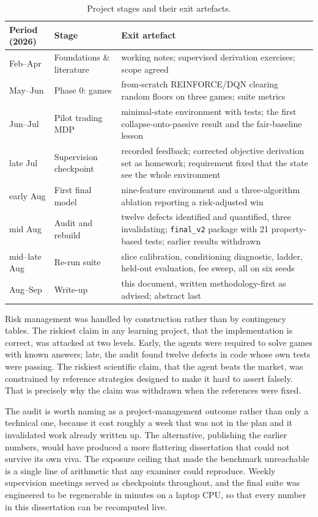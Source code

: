 \begin{table}[h]
\centering
\caption{Project stages and their exit artefacts.}
\label{tab:conc_plan}
\small
\begin{tabular}{llp{6.2cm}}
\toprule
\textbf{Period (2026)} & \textbf{Stage} & \textbf{Exit artefact} \\
\midrule
Feb--Apr & Foundations \& literature & working notes; supervised
derivation exercises; scope agreed \\
May--Jun & Phase 0: games & from-scratch REINFORCE/DQN clearing random
floors on three games; suite metrics \\
Jun--Jul & Pilot trading MDP & minimal-state environment with tests; the
first collapse-onto-passive result and the fair-baseline lesson \\
late Jul & Supervision checkpoint & recorded feedback; corrected objective
derivation set as homework; requirement fixed that the state see the whole
environment \\
early Aug & First final model & nine-feature environment and a
three-algorithm ablation reporting a risk-adjusted win \\
mid Aug & Audit and rebuild & twelve defects identified and quantified,
three invalidating; \texttt{final\_v2} package with 21 property-based
tests; earlier results withdrawn \\
mid--late Aug & Re-run suite & slice calibration, conditioning diagnostic,
ladder, held-out evaluation, fee sweep, all on six seeds \\
Aug--Sep & Write-up & this document, written methodology-first as advised;
abstract last \\
\bottomrule
\end{tabular}
\end{table}

Risk management was handled by construction rather than by contingency
tables. The riskiest claim in any learning project, that the implementation
is correct, was attacked at two levels. Early, the agents were required to
solve games with known answers; late, the audit found twelve defects in
code whose own tests were passing. The riskiest scientific claim, that the
agent beats the market, was constrained by reference strategies designed to
make it hard to assert falsely. That is precisely why the claim was
withdrawn when the references were fixed.

The audit is worth naming as a project-management outcome rather than only a
technical one, because it cost roughly a week that was not in the plan and it
invalidated work already written up. The alternative, publishing the earlier
numbers, would have produced a more flattering dissertation that could not
survive its own viva. The exposure ceiling that made the benchmark
unreachable is a single line of arithmetic that any examiner could reproduce.
Weekly supervision meetings served as checkpoints throughout, and the final
suite was engineered to be regenerable in minutes on a laptop CPU, so that
every number in this dissertation can be recomputed live.

